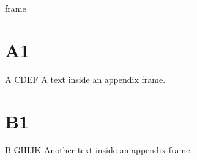 \documentclass[%
	english,  %
	]{beamer}
\begin{document}
\appendix

\begin{frame}{\appendixname{} frame}
	\centering
	\appendixname
\end{frame}

\section{A1}

\begin{frame}{A CDEF}
	A text inside an appendix frame.
\end{frame}

\section{B1}

\begin{frame}{B GHIJK}
	Another text inside an appendix frame.
\end{frame}
\end{document}
